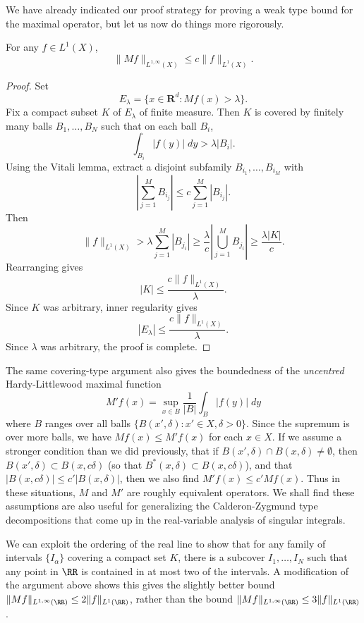 We have already indicated our proof strategy for proving a weak type bound for the maximal operator, but let us now do things more rigorously.

\begin{theorem}
  For any $f \in L^1(X)$,
  \[ \| Mf \|_{L^{1,\infty}(X)} \leq c \| f \|_{L^1(X)}. \]
\end{theorem}
\begin{proof}
  Set
  \[ E_\lambda = \{ x \in \mathbf{R}^d: Mf(x) > \lambda \}. \]
  Fix a compact subset $K$ of $E_\lambda$ of finite measure. Then $K$ is covered by finitely many balls $B_1,\dots,B_N$ such that on each ball $B_i$,
  \[ \int_{B_i} |f(y)|\; dy > \lambda |B_i|. \]
  Using the Vitali lemma, extract a disjoint subfamily $B_{i_1},\dots, B_{i_M}$ with
  \[ \left| \sum_{j = 1}^M B_{i_j} \right| \leq c \sum_{j = 1}^M |B_{i_j}|. \]
  Then
  \[ \| f \|_{L^1(X)} > \lambda \sum_{j = 1}^M |B_{j_i}| \geq \frac{\lambda}{c} \left| \bigcup_{j = 1}^M B_{j_i} \right| \geq \frac{\lambda |K|}{c}. \]
  Rearranging gives
  \[ |K| \leq \frac{c \| f \|_{L^1(X)}}{\lambda}. \]
  Since $K$ was arbitrary, inner regularity gives
  \[ |E_\lambda| \leq \frac{c \| f \|_{L^1(X)}}{\lambda}. \]
  Since $\lambda$ was arbitrary, the proof is complete.
\end{proof}

\begin{remark}
  The same covering-type argument also gives the boundedness of the \emph{uncentred} Hardy-Littlewood maximal function
  \[ M'f(x) = \sup_{x \in B} \frac{1}{|B|} \int_B |f(y)|\; dy \]
  where $B$ ranges over all balls $\{ B(x',\delta) : x' \in X, \delta > 0 \}$. Since the supremum is over more balls, we have $Mf(x) \leq M'f(x)$ for each $x \in X$. If we assume a stronger condition than we did previously, that if $B(x',\delta) \cap B(x,\delta) \neq \emptyset$, then $B(x',\delta) \subset B(x,c\delta)$ (so that $B^*(x,\delta) \subset B(x,c\delta)$), and that $|B(x,c\delta)| \leq c' |B(x,\delta)|$, then we also find $M' f(x) \leq c' Mf(x)$. Thus in these situations, $M$ and $M'$ are roughly equivalent operators. We shall find these assumptions are also useful for generalizing the Calderon-Zygmund type decompositions that come up in the real-variable analysis of singular integrals.
\end{remark}

\begin{remark}
  We can exploit the ordering of the real line to show that for any family of intervals $\{ I_\alpha \}$ covering a compact set $K$, there is a subcover $I_1,\dots, I_N$ such that any point in $\RR$ is contained in at most two of the intervals. A modification of the argument above shows this gives the slightly better bound $\| Mf \|_{L^{1,\infty}(\RR)} \leq 2 \| f \|_{L^1(\RR)}$, rather than the bound $\| Mf \|_{L^{1,\infty}(\RR)} \leq 3 \| f \|_{L^1(\RR)}$.
\end{remark}

